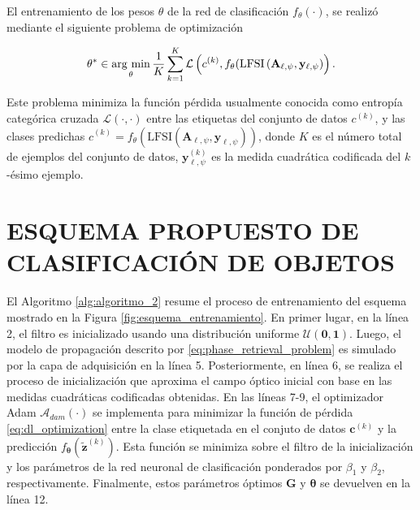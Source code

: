 El entrenamiento de los pesos $\theta$ de la red de clasificación $f_\theta(\cdot)$, se realizó mediante el siguiente problema de optimización

\begin{equation}
    \mathbf{\theta}^* \in  \operatorname*{arg \ min}_{\mathbf{\theta}} \frac{1}{K}\sum_{k = 1}^{K} \mathcal{L}\left( c^{(k)}, f_\theta(\mathrm{LFSI}\left(\mathbf{A}_{\ell,\psi},\mathbf{y}_{\ell, \psi}\right)\right).
    \label{eq:dl_optimization}
\end{equation}

Este problema minimiza la función pérdida usualmente conocida como entropía categórica cruzada $\mathcal{L}(\cdot, \cdot)$ entre las etiquetas del conjunto de datos $c^{(k)}$, y las clases predichas $\hat{c}^{(k)} = f_\theta(\mathrm{LFSI}\left(\mathbf{A}_{\ell,\psi},\mathbf{y}_{\ell, \psi}\right))$, donde $K$ es el número total de ejemplos del conjunto de datos, $\mathbf{y}_{\ell, \psi}^{(k)}$ es la medida cuadrática codificada del $k$-ésimo ejemplo.


\section{ESQUEMA PROPUESTO DE CLASIFICACIÓN DE OBJETOS}

El Algoritmo \ref{alg:algoritmo_2} resume el proceso de entrenamiento del esquema mostrado en la Figura \ref{fig:esquema_entrenamiento}. En primer lugar, en la línea 2, el filtro es inicializado usando una distribución uniforme $\mathcal{U}(\mathbf{0},\mathbf{1})$. Luego, el modelo de propagación descrito por \eqref{eq:phase_retrieval_problem} es simulado por la capa de adquisición en la línea 5. Posteriormente, en línea 6, se realiza el proceso de inicialización que aproxima el campo óptico inicial con base en las medidas cuadráticas codificadas obtenidas. En las líneas 7-9, el optimizador Adam $\mathcal{A}_{dam}(\cdot)$ se implementa para minimizar la función de pérdida \eqref{eq:dl_optimization} entre la clase etiquetada en el conjuto de datos ${\mathbf{c}}^{(k)}$ y la predicción $f_{\boldsymbol{\theta}}\left(\tilde{\mathbf{z}}^{(k)}\right)$. Esta función se minimiza sobre el filtro de la inicialización y los parámetros de la red neuronal de clasificación ponderados por $\beta_1$ y $\beta_2$, respectivamente. Finalmente, estos parámetros óptimos $\mathbf{G}$ y $\boldsymbol{\theta}$ se devuelven en la línea 12.


